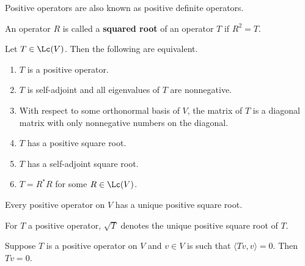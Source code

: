 \documentclass{extarticle}
\begin{document}
\begin{remark}
    Positive operators are also known as positive definite operators.
\end{remark}

\begin{definition}
    An operator \(R\) is called a \textbf{squared root} of an operator \(T\) if \(R^2 = T\).
\end{definition}

\begin{thm}
    Let \(T \in \Lc(V)\). Then the following are equivalent.
    \begin{enumerate}[label=(\alph*)]
        \item \(T\) is a positive operator.
        \item \(T\) is self-adjoint and all eigenvalues of \(T\) are nonnegative.
        \item With respect to some orthonormal basis of \(V\), the matrix of \(T\) is a diagonal
        matrix with only nonnegative numbers on the diagonal.
        \item \(T\) has a positive square root.
        \item \(T\) has a self-adjoint square root.
        \item \(T = R^* R\) for some \(R \in \Lc(V)\).
    \end{enumerate}
\end{thm}

\begin{thm}
    Every positive operator on \(V\) has a unique positive square root.
\end{thm}

\begin{remark}
    For \(T\) a positive operator, \(\sqrt{T}\) denotes the unique positive square root of \(T\).
\end{remark}

\begin{corollary}
    Suppose \(T\) is a positive operator on \(V\) and \(v \in V\) is such that \(\langle Tv,v \rangle = 0\).
    Then \(Tv = 0\).
\end{corollary}


\newpage
{}
\end{document}
